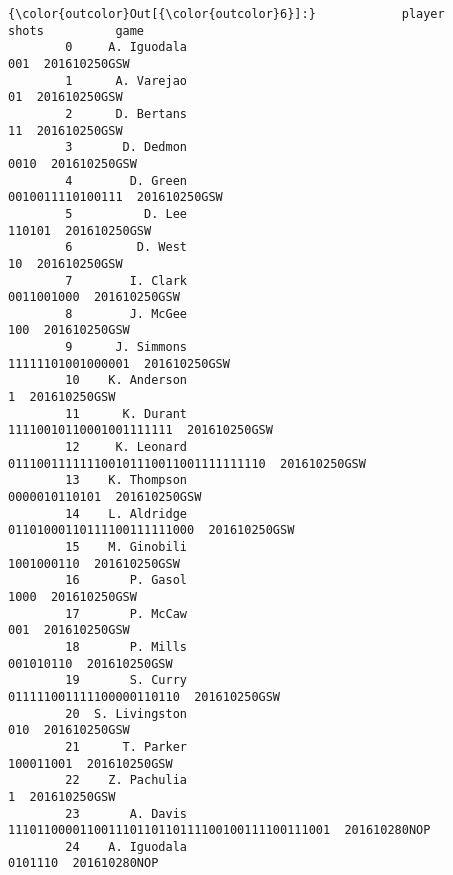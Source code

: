 \documentclass[11pt]{article}
\begin{document}
\begin{Verbatim}[commandchars=\\\{\}]
{\color{outcolor}Out[{\color{outcolor}6}]:}            player                                          shots          game
        0     A. Iguodala                                            001  201610250GSW
        1      A. Varejao                                             01  201610250GSW
        2      D. Bertans                                             11  201610250GSW
        3       D. Dedmon                                           0010  201610250GSW
        4        D. Green                               0010011110100111  201610250GSW
        5          D. Lee                                         110101  201610250GSW
        6         D. West                                             10  201610250GSW
        7        I. Clark                                     0011001000  201610250GSW
        8        J. McGee                                            100  201610250GSW
        9      J. Simmons                              11111101001000001  201610250GSW
        10    K. Anderson                                              1  201610250GSW
        11      K. Durant                        11110010110001001111111  201610250GSW
        12     K. Leonard           011100111111100101110011001111111110  201610250GSW
        13    K. Thompson                                  0000010110101  201610250GSW
        14    L. Aldridge                     01101000110111100111111000  201610250GSW
        15    M. Ginobili                                     1001000110  201610250GSW
        16       P. Gasol                                           1000  201610250GSW
        17       P. McCaw                                            001  201610250GSW
        18       P. Mills                                      001010110  201610250GSW
        19       S. Curry                       011111001111100000110110  201610250GSW
        20  S. Livingston                                            010  201610250GSW
        21      T. Parker                                      100011001  201610250GSW
        22    Z. Pachulia                                              1  201610250GSW
        23       A. Davis  111011000011001110110110111100100111100111001  201610280NOP
        24    A. Iguodala                                        0101110  201610280NOP
\end{Verbatim}
            
\end{document}
